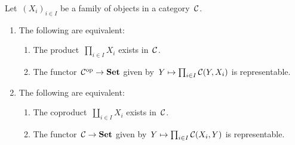 \begin{lemma}
  \label{existence of coproducts}
  Let~$(X_i)_{i \in I}$ be a family of objects in a category~$\mathcal{C}$.
  \begin{enumerate}
    \item
      The following are equivalent:
      \begin{enumerate}
        \item
          The product~$\prod_{i \in I} X_i$ exists in~$\mathcal{C}$.
        \item
          The functor~$\mathcal{C}^{\mathrm{op}} \to \mathbf{Set}$ given by~$Y \mapsto \prod_{i \in I} \mathcal{C}(Y,X_i)$ is representable.
      \end{enumerate}
    \item
      \label{for coproducts}
      The following are equivalent:
      \begin{enumerate}
        \item
          The coproduct~$\coprod_{i \in I} X_i$ exists in~$\mathcal{C}$.
        \item
          \label{functor of the product}
          The functor~$\mathcal{C} \to \mathbf{Set}$ given by~$Y \mapsto \prod_{i \in I} \mathcal{C}(X_i,Y)$ is representable.
      \end{enumerate}
  \end{enumerate}
\end{lemma}


